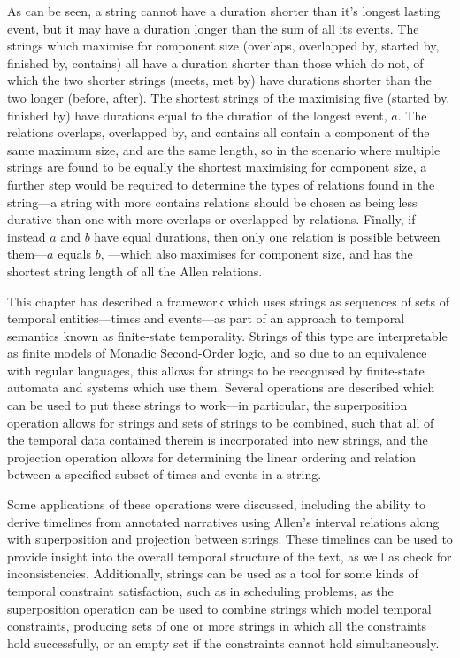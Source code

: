 \documentclass[a4paper,12pt,leqno]{article}
\newcommand{\vph}[1]{\vphantom{#1}}
\newcommand{\ebox}[1]{\fbox{$\vph{'(),}#1$}}
\newcommand{\EventString}[1]{%
	\renewcommand*{\do}[1]{\ebox{##1}}%
	\PipeParser{#1}%
}
\begin{document}
As can be seen, a string cannot have a duration shorter than it's longest lasting event, but it may have a duration longer than the sum of all its events. The strings which maximise for component size (overlaps, overlapped by, started by, finished by, contains) all have a duration shorter than those which do not, of which the two shorter strings (meets, met by) have durations shorter than the two longer (before, after). The shortest strings of the maximising five (started by, finished by) have durations equal to the duration of the longest event, $a$. The relations overlaps, overlapped by, and contains all contain a component of the same maximum size, and are the same length, so in the scenario where multiple strings are found to be equally the shortest maximising for component size, a further step would be required to determine the types of relations found in the string---a string with more contains relations should be chosen as being less durative than one with more overlaps or overlapped by relations. Finally, if instead $a$ and $b$ have equal durations, then only one relation is possible between them---$a$ equals $b$, \EventString{{}|a,b|{}}---which also maximises for component size, and has the shortest string length of all the Allen relations.

This chapter has described a framework which uses strings as sequences of sets of temporal entities---times and events---as part of an approach to temporal semantics known as finite-state temporality. Strings of this type are interpretable as finite models of Monadic Second-Order logic, and so due to an equivalence with regular languages, this allows for strings to be recognised by finite-state automata and systems which use them. Several operations are described which can be used to put these strings to work---in particular, the superposition operation allows for strings and sets of strings to be combined, such that all of the temporal data contained therein is incorporated into new strings, and the projection operation allows for determining the linear ordering and relation between a specified subset of times and events in a string.

Some applications of these operations were discussed, including the ability to derive timelines from annotated narratives using Allen's interval relations along with superposition and projection between strings. These timelines can be used to provide insight into the overall temporal structure of the text, as well as check for inconsistencies.
Additionally, strings can be used as a tool for some kinds of temporal constraint satisfaction, such as in scheduling problems, as the superposition operation can be used to combine strings which model temporal constraints, producing sets of one or more strings in which all the constraints hold successfully, or an empty set if the constraints cannot hold simultaneously.
\end{document}
